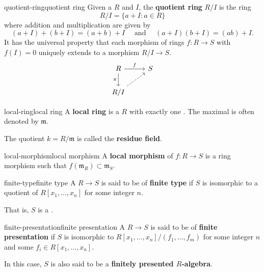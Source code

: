 \begin{topic}{quotient-ring}{quotient ring}
    Given a  $R$ and  $I$, the \textbf{quotient ring} $R/I$ is the ring
    \[ R/I = \{ a + I : a \in R \} \]
    where addition and multiplication are given by
    \[ (a + I) + (b + I) = (a + b) + I \quad \text{ and } \quad (a + I) (b + I) = (ab) + I . \]
    It has the universal property that each morphism of rings $f : R \to S$ with $f(I) = 0$ uniquely extends to a morphism $R/I \to S$.
    \[ \begin{tikzcd} R \arrow{r}{f} \arrow[swap]{d}{\pi} & S \\ R/I \arrow[dashed]{ur} & \end{tikzcd} \]
\end{topic}

\begin{topic}{local-ring}{local ring}
    A \textbf{local ring} is a  $R$ with exactly one . The maximal is often denoted by $\mathfrak{m}$.
    
    The quotient $k = R/\mathfrak{m}$ is called the \textbf{residue field}.
\end{topic}

\begin{topic}{local-morphism}{local morphism}
    A \textbf{local morphism} of  $f : R \to S$ is a ring morphism such that $f(\mathfrak{m}_R) \subset \mathfrak{m}_S$.
\end{topic}

\begin{topic}{finite-type}{finite type}
    A  $R \to S$ is said to be of \textbf{finite type} if $S$ is isomorphic to a quotient of $R[x_1, \ldots, x_n]$ for some integer $n$.
    
    That is, $S$ is a .
\end{topic}

\begin{topic}{finite-presentation}{finite presentation}
    A  $R \to S$ is said to be of \textbf{finite presentation} if $S$ is isomorphic to $R[x_1, \ldots, x_n] / (f_1, \ldots, f_m)$ for some integer $n$ and some $f_i \in R[x_1, \ldots, x_n]$.
    
    In this case, $S$ is also said to be a \textbf{finitely presented $R$-algebra}.
\end{topic}

